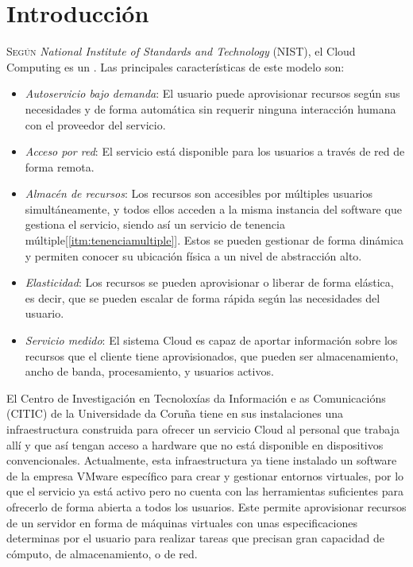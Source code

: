 \chapter{Introducción}
\label{chap:introducion}
\lettrine{S}{egún} \textit{National Institute of Standards and Technology} (NIST), el Cloud Computing es un \cite{DefCloudComputing}. Las principales características de este modelo son\label{nist}:
\begin{itemize}
    \item \emph{Autoservicio bajo demanda}: El usuario puede aprovisionar recursos según sus necesidades y de forma automática sin requerir ninguna interacción humana con el proveedor del servicio.
    \item \emph{Acceso por red}: El servicio está disponible para los usuarios a través de red de forma remota.
    \item \emph{Almacén de recursos}: Los recursos son accesibles por múltiples usuarios simultáneamente, y todos ellos acceden a la misma instancia del software que gestiona el servicio, siendo así un servicio de tenencia múltiple[\ref{itm:tenenciamultiple}]. Estos se pueden gestionar de forma dinámica y permiten conocer su ubicación física a un nivel de abstracción alto.
    \item \emph{Elasticidad}: Los recursos se pueden aprovisionar o liberar de forma elástica, es decir, que se pueden escalar de forma rápida según las necesidades del usuario.
    \item \emph{Servicio medido}: El sistema Cloud es capaz de aportar información sobre los recursos que el cliente tiene aprovisionados, que pueden ser almacenamiento, ancho de banda, procesamiento, y usuarios activos.
\end{itemize}
 
 El Centro de Investigación en Tecnoloxías da Información e as Comunicacións (CITIC) de la Universidade da Coruña tiene en sus instalaciones una infraestructura construida para ofrecer un servicio Cloud al personal que trabaja allí y que así tengan acceso a hardware que no está disponible en dispositivos convencionales. Actualmente, esta infraestructura ya tiene instalado un software de la empresa VMware específico para crear y gestionar entornos virtuales, por lo que el servicio ya está activo pero no cuenta con las herramientas suficientes para ofrecerlo de forma abierta a todos los usuarios. Este permite aprovisionar recursos de un servidor en forma de máquinas virtuales con unas especificaciones determinas por el usuario para realizar tareas que precisan gran capacidad de cómputo, de almacenamiento, o de red.\\
 
